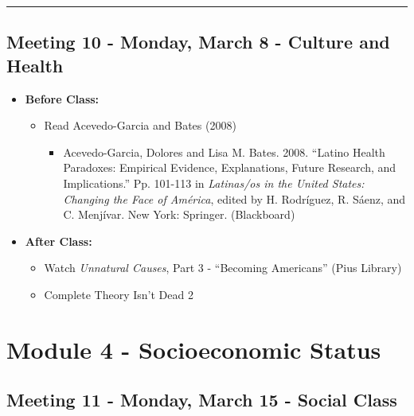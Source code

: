 \documentclass[
]{book}
\providecommand{\tightlist}{%
  \setlength{\itemsep}{0pt}\setlength{\parskip}{0pt}}
\begin{document}
\begin{center}\rule{0.5\linewidth}{0.5pt}\end{center}

\hypertarget{meeting-10---monday-march-8---culture-and-health}{%
\subsection*{Meeting 10 - Monday, March 8 - Culture and Health}\label{meeting-10---monday-march-8---culture-and-health}}

\begin{itemize}
\tightlist
\item
  \textbf{Before Class:}

  \begin{itemize}
  \tightlist
  \item
    Read Acevedo-Garcia and Bates (2008)

    \begin{itemize}
    \tightlist
    \item
      Acevedo-Garcia, Dolores and Lisa M. Bates. 2008. ``Latino Health Paradoxes: Empirical Evidence, Explanations, Future Research, and Implications.'' Pp. 101-113 in \emph{Latinas/os in the United States: Changing the Face of América}, edited by H. Rodríguez, R. Sáenz, and C. Menjívar. New York: Springer. (Blackboard)
    \end{itemize}
  \end{itemize}
\item
  \textbf{After Class:}

  \begin{itemize}
  \tightlist
  \item
    Watch \emph{Unnatural Causes}, Part 3 - ``Becoming Americans'' (Pius Library)
  \item
    Complete Theory Isn't Dead 2
  \end{itemize}
\end{itemize}

\newpage

\hypertarget{module-4---socioeconomic-status}{%
\section{Module 4 - Socioeconomic Status}\label{module-4---socioeconomic-status}}

\hypertarget{meeting-11---monday-march-15---social-class}{%
\subsection*{Meeting 11 - Monday, March 15 - Social Class}\label{meeting-11---monday-march-15---social-class}}
\end{document}
